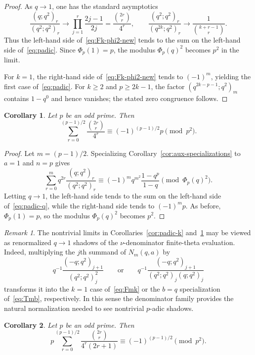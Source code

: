 \documentclass[reqno]{amsart}
\theoremstyle{definition}
\theoremstyle{plain}
\newtheorem{corollary}{Corollary}
\theoremstyle{remark}
\newtheorem{remark}{Remark}
\numberwithin{equation}{section}
\begin{document}
\begin{proof}
As $q\to 1$, one has the standard asymptotics
\[
\frac{(q;q^2)_r}{(q^2;q^2)_r}\to \prod_{j=1}^{r}\frac{2j-1}{2j}=\frac{\binom{2r}{r}}{4^r},
\qquad
\frac{(q^2;q^2)_r}{(q^{2k};q^2)_r}\to \frac{1}{\binom{k+r-1}{r}}.
\]
Thus the left-hand side of~\eqref{eq:Fk-phi2-new} tends to the sum on the left-hand side of~\eqref{eq:padic}. Since $\Phi_p(1)=p$, the modulus $\Phi_p(q)^2$ becomes $p^2$ in the limit.

For $k=1$, the right-hand side of~\eqref{eq:Fk-phi2-new} tends to $(-1)^m$, yielding the first case of~\eqref{eq:padic}. For $k\ge 2$ and $p\ge 2k-1$, the factor $(q^{2k-p-1};q^2)_m$ contains $1-q^0$ and hence vanishes; the stated zero congruence follows.
\end{proof}

\begin{corollary}\label{cor:padic-q}
Let $p$ be an odd prime. Then
\begin{equation}\label{eq:padic-q}
\sum_{r=0}^{(p-1)/2}\frac{\binom{2r}{r}}{4^r}
\equiv (-1)^{(p-1)/2}p \pmod{p^2}.
\end{equation}
\end{corollary}

\begin{proof}
Let $m=(p-1)/2$. Specializing Corollary~\ref{cor:aux-specializations} to $a=1$ and $n=p$ gives
\[
\sum_{r=0}^{m} q^{2r}\frac{(q;q^2)_r}{(q^2;q^2)_r}
\equiv (-1)^m q^{m^2}\frac{1-q^p}{1-q}
\pmod{\Phi_p(q)^2}.
\]
Letting $q\to 1$, the left-hand side tends to the sum on the left-hand side of~\eqref{eq:padic-q}, while the right-hand side tends to $(-1)^m p$. As before, $\Phi_p(1)=p$, so the modulus $\Phi_p(q)^2$ becomes $p^2$.
\end{proof}

\begin{remark}\label{rem:nu-renormalized}
The nontrivial limits in Corollaries~\ref{cor:padic-k} and~\ref{cor:padic-q} may be viewed as renormalized $q\to 1$ shadows of the $\nu$-denominator finite-theta evaluation. Indeed, multiplying the $j$th summand of $N_m(q,a)$ by
\[
q^{-1}\frac{(-q;q^2)_{j+1}}{(q^2;q^2)_j^2}
\qquad\text{or}\qquad
q^{-1}\frac{(-q;q^2)_{j+1}}{(q^2;q^2)_j(q;q^2)_j}
\]
transforms it into the $k=1$ case of~\eqref{eq:Fmk} or the $b=q$ specialization of~\eqref{eq:Tmb}, respectively. In this sense the denominator family provides the natural normalization needed to see nontrivial $p$-adic shadows.
\end{remark}

\begin{corollary}\label{cor:padic-q3}
Let $p$ be an odd prime. Then
\begin{equation}\label{eq:padic-q3}
p\sum_{r=0}^{(p-1)/2}\frac{\binom{2r}{r}}{4^r(2r+1)}
\equiv (-1)^{(p-1)/2}\pmod{p^2}.
\end{equation}
\end{corollary}
\end{document}
